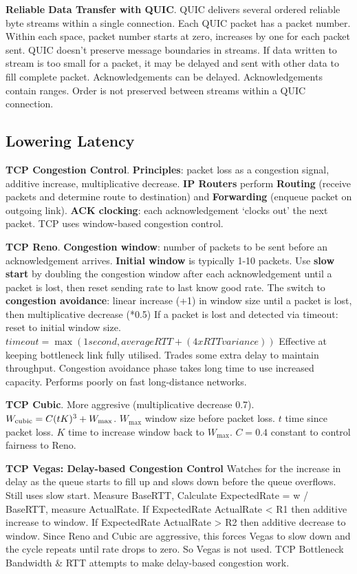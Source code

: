\documentclass{article}
\begin{document}
\textbf{Reliable Data Transfer with QUIC}.
QUIC delivers several ordered reliable byte streams within a single connection.
Each QUIC packet has a packet number.
Within each space, packet number starts at zero, increases by one for each packet sent.
QUIC doesn’t preserve message boundaries in streams.
If data written to stream is too small for a packet, it may be
delayed and sent with other data to fill complete packet.
Acknowledgements can be delayed.
Acknowledgements contain ranges.
Order is not preserved between streams within a QUIC connection.


\subsection*{Lowering Latency}

\textbf{TCP Congestion Control}.
\textbf{Principles}: packet loss as a congestion signal, additive increase, multiplicative decrease.
\textbf{IP Routers} perform \textbf{Routing} (receive packets and determine route to destination) and
\textbf{Forwarding} (enqueue packet on outgoing link).
\textbf{ACK clocking}: each acknowledgement `clocks out' the next packet.
TCP uses window-based congestion control.

\textbf{TCP Reno}.
\textbf{Congestion window}: number of packets to be sent before an acknowledgement arrives.
\textbf{Initial window} is typically 1-10 packets.
Use \textbf{slow start} by doubling the congestion window after each acknowledgement until a packet is lost,
then reset sending rate to last know good rate.
The switch to \textbf{congestion avoidance}: linear increase (+1) in window size until a packet is lost, then multiplicative decrease (*0.5)
If a packet is lost and detected via timeout: reset to initial window size.
$timeout = \max(1 second, average RTT + (4 x RTT variance))$
Effective at keeping bottleneck link fully utilised.
Trades some extra delay to maintain throughput.
Congestion avoidance phase takes long time to use increased capacity.
Performs poorly on fast long-distance networks.

\textbf{TCP Cubic}.
More aggresive (multiplicative decrease 0.7).
$W_{\text{cubic}} = C (t \- K)^3 + W_{\text{max}}$.
$W_{\text{max}}$ window size before packet loss.
$t$ time since packet loss.
$K$ time to increase window back to $W_{\text{max}}$.
$C = 0.4$ constant to control fairness to Reno.

\textbf{TCP Vegas: Delay-based Congestion Control}
Watches for the increase in delay as the queue starts to fill up and slows down before the queue overflows.
Still uses slow start.
Measure BaseRTT, Calculate ExpectedRate = w / BaseRTT, measure ActualRate.
If ExpectedRate \- ActualRate < R1 then additive increase to window.
If ExpectedRate \- ActualRate > R2 then additive decrease to window.
Since Reno and Cubic are aggressive, this forces Vegas to slow down and the cycle repeats until rate drops to zero.
So Vegas is not used. TCP Bottleneck Bandwidth \& RTT attempts to make delay-based congestion work.
\end{document}
